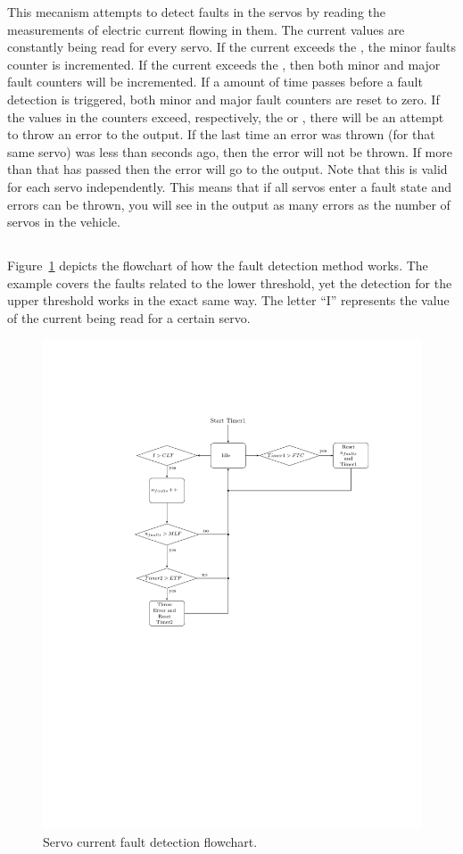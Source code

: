 This mecanism attempts to detect faults in the servos by reading the measurements of electric current flowing in them.
The current values are constantly being read for every servo. If the current exceeds the \scfdCLT, the minor faults counter is incremented. If the current exceeds the \scfdCUT, then both minor and major fault counters will be incremented. If a \scfdFTC amount of time passes before a fault detection is triggered, both minor and major fault counters are reset to zero.
If the values in the counters exceed, respectively, the \scfdMLF or \scfdMUF, there will be an attempt to throw an error to the output.
If the last time an error was thrown (for that same servo) was less than \scfdETP seconds ago, then the error will not be thrown. If more than that has passed then the error will go to the output. Note that this is valid for each servo independently. This means that if all servos enter a fault state and errors can be thrown, you will see in the output as many errors as the number of servos in the vehicle.

\subsection{\secnameFlowchart}

Figure~\ref{fig:servocurrfault} depicts the flowchart of how the fault detection method works. The example covers the faults related to the lower threshold, yet the detection for the upper threshold works in the exact same way. The letter ``I'' represents the value of the current being read for a certain servo.

\begin{figure}[htbp]
\begin{center}
\includegraphics*[viewport= 147 325 533 670, scale=1.0]{figures/servocurrentfault.pdf}
\end{center}
\caption{Servo current fault detection flowchart.}\label{fig:servocurrfault}
\end{figure}